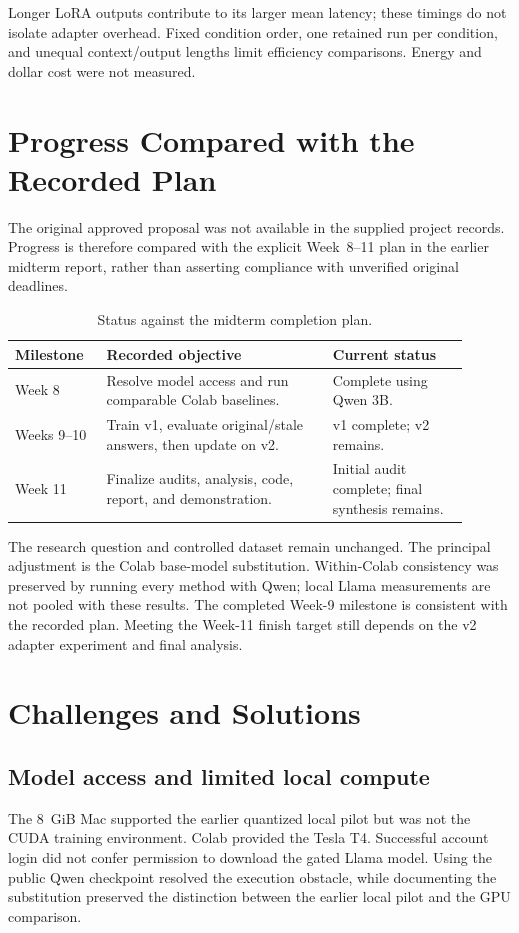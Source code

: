 \documentclass[10pt,letterpaper]{article}
\begin{document}
Longer LoRA outputs contribute to its larger mean latency; these timings do not isolate adapter overhead. Fixed condition order, one retained run per condition, and unequal context/output lengths limit efficiency comparisons. Energy and dollar cost were not measured.

\clearpage
\section{Progress Compared with the Recorded Plan}
The original approved proposal was not available in the supplied project records. Progress is therefore compared with the explicit Week~8--11 plan in the earlier midterm report, rather than asserting compliance with unverified original deadlines.

\begin{table}[htbp]\centering\small
\caption{Status against the midterm completion plan.}
\begin{tabular}{P{0.18\linewidth}P{0.45\linewidth}P{0.27\linewidth}}\toprule
Milestone & Recorded objective & Current status\\\midrule
Week 8 & Resolve model access and run comparable Colab baselines. & Complete using Qwen 3B.\\
Weeks 9--10 & Train v1, evaluate original/stale answers, then update on v2. & v1 complete; v2 remains.\\
Week 11 & Finalize audits, analysis, code, report, and demonstration. & Initial audit complete; final synthesis remains.\\\bottomrule
\end{tabular}
\end{table}

The research question and controlled dataset remain unchanged. The principal adjustment is the Colab base-model substitution. Within-Colab consistency was preserved by running every method with Qwen; local Llama measurements are not pooled with these results. The completed Week-9 milestone is consistent with the recorded plan. Meeting the Week-11 finish target still depends on the v2 adapter experiment and final analysis.

\section{Challenges and Solutions}
\subsection{Model access and limited local compute}
The 8~GiB Mac supported the earlier quantized local pilot but was not the CUDA training environment. Colab provided the Tesla T4. Successful account login did not confer permission to download the gated Llama model. Using the public Qwen checkpoint resolved the execution obstacle, while documenting the substitution preserved the distinction between the earlier local pilot and the GPU comparison.
\end{document}

